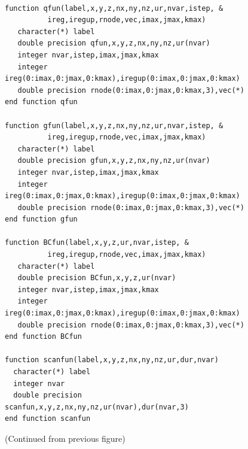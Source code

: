 \documentclass[a4paper,twoside,11pt]{book}
\begin{document}
\begin{figure}
\begin{verbatim}
     
function qfun(label,x,y,z,nx,ny,nz,ur,nvar,istep, &
          ireg,iregup,rnode,vec,imax,jmax,kmax)
   character(*) label
   double precision qfun,x,y,z,nx,ny,nz,ur(nvar)
   integer nvar,istep,imax,jmax,kmax
   integer ireg(0:imax,0:jmax,0:kmax),iregup(0:imax,0:jmax,0:kmax)
   double precision rnode(0:imax,0:jmax,0:kmax,3),vec(*)
end function qfun
     
function gfun(label,x,y,z,nx,ny,nz,ur,nvar,istep, &
          ireg,iregup,rnode,vec,imax,jmax,kmax)
   character(*) label
   double precision gfun,x,y,z,nx,ny,nz,ur(nvar)
   integer nvar,istep,imax,jmax,kmax
   integer ireg(0:imax,0:jmax,0:kmax),iregup(0:imax,0:jmax,0:kmax)
   double precision rnode(0:imax,0:jmax,0:kmax,3),vec(*)
end function gfun

function BCfun(label,x,y,z,ur,nvar,istep, &
          ireg,iregup,rnode,vec,imax,jmax,kmax)
   character(*) label
   double precision BCfun,x,y,z,ur(nvar)
   integer nvar,istep,imax,jmax,kmax
   integer ireg(0:imax,0:jmax,0:kmax),iregup(0:imax,0:jmax,0:kmax)
   double precision rnode(0:imax,0:jmax,0:kmax,3),vec(*)
end function BCfun

function scanfun(label,x,y,z,nx,ny,nz,ur,dur,nvar)
  character(*) label
  integer nvar
  double precision scanfun,x,y,z,nx,ny,nz,ur(nvar),dur(nvar,3)
end function scanfun

\end{verbatim}
\caption{(Continued from previous figure)}
\label{template2}
\end{figure}
\end{document}

